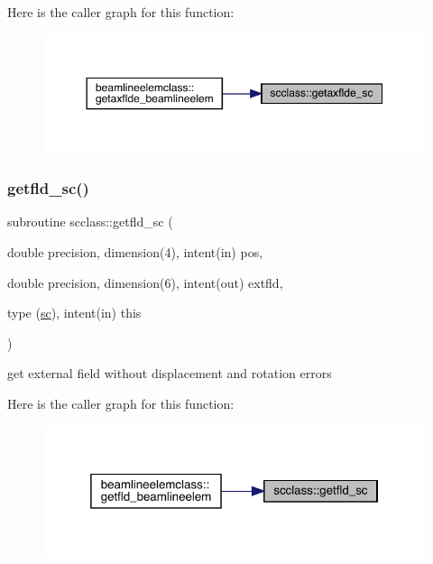 Here is the caller graph for this function\+:\nopagebreak
\begin{figure}[H]
\begin{center}
\leavevmode
\includegraphics[width=350pt]{namespacescclass_aefc9ea62cf36830e2c74869fff2f1b17_icgraph}
\end{center}
\end{figure}
\mbox{\label{namespacescclass_a5af81e94b531e8d02789525f1f4438ac}} 
\subsubsection{\texorpdfstring{getfld\_sc()}{getfld\_sc()}}
{\footnotesize\ttfamily subroutine scclass\+::getfld\+\_\+sc (\begin{DoxyParamCaption}\item[{double precision, dimension(4), intent(in)}]{pos,  }\item[{double precision, dimension(6), intent(out)}]{extfld,  }\item[{type (\mbox{\hyperlink{namespacescclass_structscclass_1_1sc}{sc}}), intent(in)}]{this }\end{DoxyParamCaption})}



get external field without displacement and rotation errors 

Here is the caller graph for this function\+:\nopagebreak
\begin{figure}[H]
\begin{center}
\leavevmode
\includegraphics[width=319pt]{namespacescclass_a5af81e94b531e8d02789525f1f4438ac_icgraph}
\end{center}
\end{figure}
\mbox{\label{namespacescclass_abe42c84df8190cc0443752dff296dd89}} 
